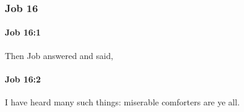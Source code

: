 	\subsubsection{Job 16} %
		\label{JOB-16}

		\paragraph{Job 16:1} %
			\label{JOB-16-1}

			Then Job answered and said,


		\paragraph{Job 16:2} %
			\label{JOB-16-2}

			I have heard many such things: miserable comforters are ye all.


